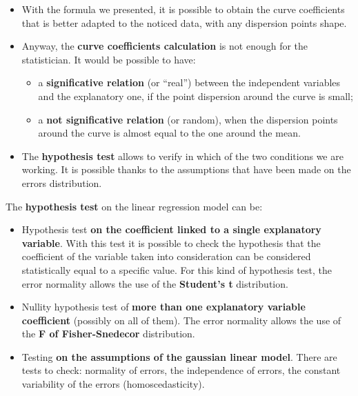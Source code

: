 \begin{frame}
  \vspace*{.25cm}
  \begin{itemize}
    \item With the formula we presented, it is possible to obtain the curve coefficients that is better adapted to the noticed data, with any dispersion points shape.  
    \item Anyway, the \textbf{curve coefficients calculation} is not enough for the statistician. It would be possible to have:
    \begin{itemize}
      \item a \textbf{significative relation} (or ``real'') between the independent variables and the explanatory one, if the point dispersion around the curve is small;
      \item a \textbf{not significative relation} (or random), when the dispersion points around the curve is almost equal to the one around the mean.
    \end{itemize}
    \item The \textbf{hypothesis test} allows to verify in which of the two conditions we are working. It is possible thanks to the assumptions that have been made on the errors distribution. 
  \end{itemize}
\end{frame}

\begin{frame}
  The \textbf{hypothesis test} on the linear regression model can be:
  \begin{itemize}
    \item Hypothesis test \textbf{on the coefficient linked to a single explanatory variable}. With this test it is possible to check the hypothesis that the coefficient of the variable taken into consideration can be considered statistically equal to a specific value. For this kind of hypothesis test, the error normality allows the use of the \textbf{Student's t} distribution.
    \item Nullity hypothesis test of \textbf{more than one explanatory variable coefficient} (possibly on all of them). The error normality allows the use of the \textbf{F of Fisher-Snedecor} distribution.
    \item Testing \textbf{on the assumptions of the gaussian linear model}. There are tests to check: normality of errors, the independence of errors,  the constant variability of the errors (homoscedasticity).
  \end{itemize}
\end{frame}

